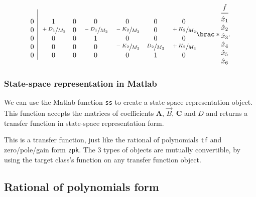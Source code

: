 \documentclass[12pt]{article}
\DeclarePairedDelimiter\brac[]%
\begin{document}
\begin{equation}
\begin{array}{*4{@{}c}@{}}
{\begin{array}{@{}c|*6c@{}}
            \\*
                0 & 1 & 0 & 0 & 0 & 0 & 0
            \\*
                0 & \sfrac{+D_1}{M_2} & 0 & \sfrac{-D_1}{M_2} & \sfrac{-K_2}{M_2} & 0 & \sfrac{+K_2}{M_2}
            \\*
                0 & 0 & 0 & 1 & 0 & 0 & 0
            \\*
                0 & 0 & 0 & 0 & \sfrac{-K_2}{M_3} &  \sfrac{D_2}{M_3} & \sfrac{+K_2}{M_3}
            \\*
                0 & 0 & 0 & 0 & 0 & 1 & 0
            \\*
            \end{array}
        }
        &
        \brac*{
            \begin{array}{@{}c@{}}
                f \\*
            \midrule
                {\hat{x}}_1 \\* {\hat{x}}_2 \\*
                {\hat{x}}_3 \\* {\hat{x}}_4 \\*
                {\hat{x}}_5 \\* {\hat{x}}_6 \\*
            \end{array}
        }.
    \end{array}
\end{equation}

\subsubsection{State-space representation in Matlab}

We can use the Matlab function \texttt{ss} to create a state-space representation object.
This function accepts the matrices of coefficients $\mathbf{A}$, $\vec{B}$, $\mathbf{C}$ and $D$ and returns a transfer function in state-space representation form.

This is a transfer function, just like the rational of polynomials \texttt{tf} and zero/pole/gain form \texttt{zpk}.
The $3$ types of objects are mutually convertible,
by using the target class's function on any transfer function object.

\subsection{Rational of polynomials form}
\end{document}
